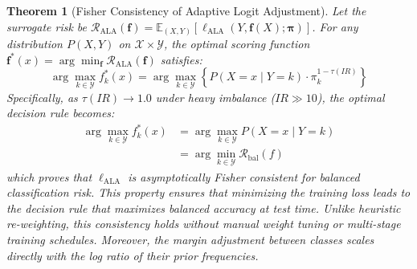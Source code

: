 \documentclass[10pt,journal,compsoc]{IEEEtran}
\newtheorem{theorem}{Theorem}
\begin{document}
\begin{theorem}[Fisher Consistency of Adaptive Logit Adjustment]
\label{thm:fisher_consistency}
Let the surrogate risk be $\mathcal{R}_{\text{ALA}}(\mathbf{f}) = \mathbb{E}_{(X, Y)} [\ell_{\text{ALA}}(Y, \mathbf{f}(X); \boldsymbol{\pi})]$. For any distribution $P(X, Y)$ on $\mathcal{X} \times \mathcal{Y}$, the optimal scoring function $\mathbf{f}^*(x) = \arg\min_{\mathbf{f}} \mathcal{R}_{\text{ALA}}(\mathbf{f})$ satisfies:
\begin{equation}
    \arg\max_{k \in \mathcal{Y}} f_k^*(x) = \arg\max_{k \in \mathcal{Y}} \left\{ P(X=x \mid Y=k) \cdot \pi_k^{1 - \tau(IR)} \right\}
\end{equation}
Specifically, as $\tau(IR) \to 1.0$ under heavy imbalance ($IR \gg 10$), the optimal decision rule becomes:
\begin{align}
    \arg\max_{k \in \mathcal{Y}} f_k^*(x) &= \arg\max_{k \in \mathcal{Y}} P(X=x \mid Y=k) \nonumber \\
    &= \arg\min_{k \in \mathcal{Y}} \mathcal{R}_{\text{bal}}(f)
\end{align}
which proves that $\ell_{\text{ALA}}$ is asymptotically Fisher consistent for balanced classification risk. This property ensures that minimizing the training loss leads to the decision rule that maximizes balanced accuracy at test time. Unlike heuristic re-weighting, this consistency holds without manual weight tuning or multi-stage training schedules. Moreover, the margin adjustment between classes scales directly with the log ratio of their prior frequencies.
\end{theorem}
\end{document}
